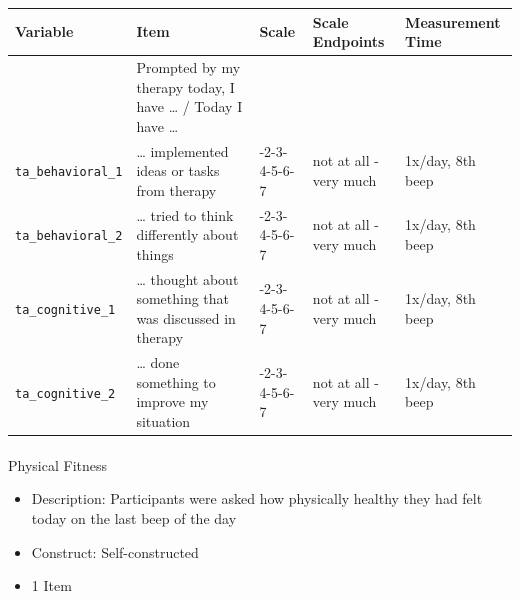 \documentclass[
  letterpaper,
  DIV=11,
  numbers=noendperiod]{scrartcl}
\makeatletter
\let\oldparagraph\paragraph
\renewcommand{\paragraph}{
    \@ifstar
      \xxxParagraphStar
      \xxxParagraphNoStar
  }
\newcommand{\xxxParagraphStar}[1]{\oldparagraph*{#1}\mbox{}}
\newcommand{\xxxParagraphNoStar}[1]{\oldparagraph{#1}\mbox{}}
\makeatother
\begin{document}
\begin{longtable}[]{@{}
  >{\raggedright\arraybackslash}p{}
  >{\raggedright\arraybackslash}p{}
  >{\raggedright\arraybackslash}p{}
  >{\raggedright\arraybackslash}p{}
  >{\raggedright\arraybackslash}p{}@{}}
\toprule\noalign{}
\begin{minipage}[b]{\linewidth}\raggedright
Variable
\end{minipage} & \begin{minipage}[b]{\linewidth}\raggedright
Item
\end{minipage} & \begin{minipage}[b]{\linewidth}\raggedright
Scale
\end{minipage} & \begin{minipage}[b]{\linewidth}\raggedright
Scale Endpoints
\end{minipage} & \begin{minipage}[b]{\linewidth}\raggedright
Measurement Time
\end{minipage} \\
\midrule\noalign{}
\endhead
\bottomrule\noalign{}
\endlastfoot
& Prompted by my therapy today, I have \ldots{} / Today I have \ldots{}
& & & \\
\texttt{ta\_behavioral\_1} & \ldots{} implemented ideas or tasks from
therapy & 1-2-3-4-5-6-7 & not at all - very much & 1x/day, 8th beep \\
\texttt{ta\_behavioral\_2} & \ldots{} tried to think differently about
things & 1-2-3-4-5-6-7 & not at all - very much & 1x/day, 8th beep \\
\texttt{ta\_cognitive\_1} & \ldots{} thought about something that was
discussed in therapy & 1-2-3-4-5-6-7 & not at all - very much & 1x/day,
8th beep \\
\texttt{ta\_cognitive\_2} & \ldots{} done something to improve my
situation & 1-2-3-4-5-6-7 & not at all - very much & 1x/day, 8th beep \\
\end{longtable}

\paragraph{Physical Fitness}\label{physical-fitness}

\begin{itemize}
\item
  Description: Participants were asked how physically healthy they had
  felt today on the last beep of the day
\item
  Construct: Self-constructed
\item
  1 Item
\end{itemize}
\end{document}
